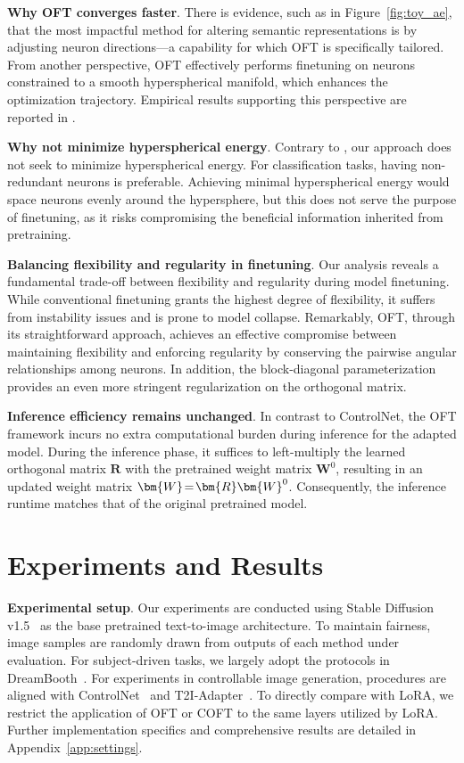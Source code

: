 \textbf{Why OFT converges faster}. There is evidence, such as in Figure~\ref{fig:toy_ae}, that the most impactful method for altering semantic representations is by adjusting neuron directions—a capability for which OFT is specifically tailored. From another perspective, OFT effectively performs finetuning on neurons constrained to a smooth hyperspherical manifold, which enhances the optimization trajectory. Empirical results supporting this perspective are reported in \cite{liu2021orthogonal}.

\textbf{Why not minimize hyperspherical energy}. Contrary to \cite{liu2021orthogonal}, our approach does not seek to minimize hyperspherical energy. For classification tasks, having non-redundant neurons is preferable. Achieving minimal hyperspherical energy would space neurons evenly around the hypersphere, but this does not serve the purpose of finetuning, as it risks compromising the beneficial information inherited from pretraining.

\textbf{Balancing flexibility and regularity in finetuning}. Our analysis reveals a fundamental trade-off between flexibility and regularity during model finetuning. While conventional finetuning grants the highest degree of flexibility, it suffers from instability issues and is prone to model collapse. Remarkably, OFT, through its straightforward approach, achieves an effective compromise between maintaining flexibility and enforcing regularity by conserving the pairwise angular relationships among neurons. In addition, the block-diagonal parameterization provides an even more stringent regularization on the orthogonal matrix.

\textbf{Inference efficiency remains unchanged}. In contrast to ControlNet, the OFT framework incurs no extra computational burden during inference for the adapted model. During the inference phase, it suffices to left-multiply the learned orthogonal matrix $\bm{R}$ with the pretrained weight matrix $\bm{W}^0$, resulting in an updated weight matrix $\thickmuskip=2mu \medmuskip=2mu \bm{W} = \bm{R} \bm{W}^0$. Consequently, the inference runtime matches that of the original pretrained model.

\section{Experiments and Results}

\textbf{Experimental setup}. Our experiments are conducted using Stable Diffusion v1.5~\cite{rombach2022high} as the base pretrained text-to-image architecture. To maintain fairness, image samples are randomly drawn from outputs of each method under evaluation. For subject-driven tasks, we largely adopt the protocols in DreamBooth~\cite{ruiz2023dreambooth}. For experiments in controllable image generation, procedures are aligned with ControlNet~\cite{zhang2023adding} and T2I-Adapter~\cite{mou2023t2i}. To directly compare with LoRA, we restrict the application of OFT or COFT to the same layers utilized by LoRA. Further implementation specifics and comprehensive results are detailed in Appendix~\ref{app:settings}.

